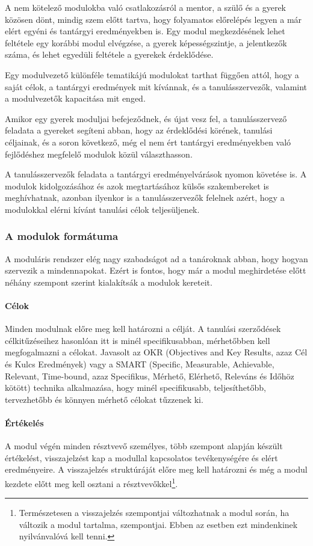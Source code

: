 A nem kötelező modulokba való csatlakozásról a mentor, a szülő és a gyerek közösen dönt, mindig szem előtt tartva, hogy folyamatos előrelépés legyen a már elért egyéni és tantárgyi eredményekben is. Egy modul megkezdésének lehet feltétele egy korábbi modul elvégzése, a gyerek képességszintje, a jelentkezők száma, és lehet egyedüli feltétele a gyerekek érdeklődése.

Egy modulvezető különféle tematikájú modulokat tarthat függően attól, hogy a saját célok, a tantárgyi eredmények mit kívánnak, és a tanulásszervezők, valamint a modulvezetők kapacitása mit enged.

Amikor egy gyerek moduljai befejeződnek, és újat vesz fel, a tanulásszervező feladata a gyereket segíteni abban, hogy az érdeklődési körének, tanulási céljainak, és a soron következő, még el nem ért tantárgyi eredményekben való fejlődéshez megfelelő modulok közül választhasson.

A tanulásszervezők feladata a tantárgyi eredményelvárások nyomon követése is. A modulok kidolgozásához és azok megtartásához külsős szakembereket is meghívhatnak, azonban ilyenkor is a tanulásszervezők felelnek azért, hogy a modulokkal elérni kívánt tanulási célok teljesüljenek.

\subsubsection{A modulok formátuma}

A moduláris rendszer elég nagy szabadságot ad a tanároknak abban, hogy hogyan szervezik a mindennapokat. Ezért is fontos, hogy már a modul meghirdetése előtt néhány szempont szerint kialakítsák a modulok kereteit.

\paragraph{Célok} Minden modulnak előre meg kell határozni a célját. A tanulási szerződések célkitűzéseihez hasonlóan itt is minél specifikusabban, mérhetőbben kell megfogalmazni a célokat. Javasolt az OKR  (Objectives and Key Results, azaz	Cél és Kulcs Eredmények) \citep{okr} vagy a SMART (Specific, Measurable, Achievable, Relevant, Time-bound, azaz Specifikus,  Mérhető, Elérhető, Releváns és Időhöz kötött) \citep{wiki:smart} technika alkalmazása, hogy minél specifikusabb, teljesíthetőbb, tervezhetőbb és könnyen mérhető célokat tűzzenek ki.

\paragraph{Értékelés} A modul végén minden résztvevő személyes, több szem\-pont alap\-ján készült értékelést, visszajelzést kap a modullal kapcsolatos tevékenységére és elért eredményeire. A visszajelzés struktúráját előre meg kell határozni és még a modul kezdete előtt meg kell osztani a résztvevőkkel\footnote{Természetesen a visszajelzés szempontjai változhatnak a modul során, ha változik a modul tartalma, szempontjai. Ebben az esetben ezt mindenkinek nyilvánvalóvá kell tenni.}.


